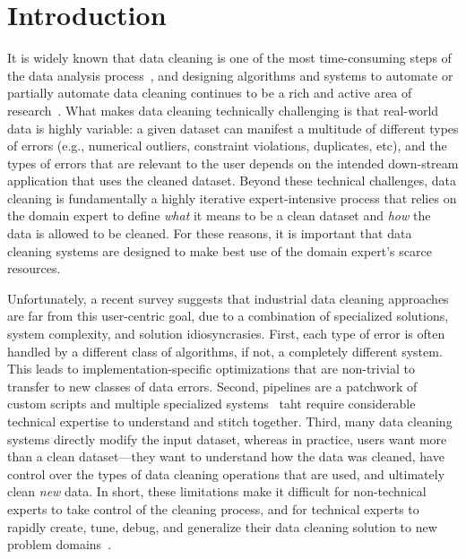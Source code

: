 \section{Introduction}\label{intro}\sloppy
It is widely known that data cleaning is one of the most time-consuming steps of the data analysis process~\cite{nytimes}, and
designing algorithms and systems to automate or partially automate data cleaning continues to be a rich and active area of research~\cite{DBLP:conf/sigmod/ChuIKW16}.
What makes data cleaning technically challenging is that real-world data is highly variable: a given dataset can manifest a multitude of different types of errors (e.g., numerical outliers, constraint violations, duplicates, etc), and the types of errors that are relevant to the user depends on the intended down-stream application that uses the cleaned dataset.
Beyond these technical challenges, data cleaning is fundamentally a highly iterative expert-intensive process that relies on the domain expert to define {\it what} it means to be a clean dataset and {\it how} the data is allowed to be cleaned.
For these reasons, it is important that data cleaning systems are designed to make best use of the domain expert's scarce resources.


Unfortunately, a recent survey suggests that industrial data cleaning approaches are far from this user-centric goal, due to a combination of specialized solutions, system complexity, and solution idiosyncrasies.  First, each type of error is often handled by a different class of algorithms, if not, a completely different system.  This leads to implementation-specific optimizations that are non-trivial to transfer to new classes of data errors.   Second, pipelines are a patchwork of custom scripts and multiple specialized systems~\cite{krishnan2016hilda} taht require considerable technical expertise to understand and stitch together.  Third, many data cleaning systems directly modify the input dataset, whereas in practice, users want more than a clean dataset---they want to understand how the data was cleaned, have control over the types of data cleaning operations that are used, and ultimately clean {\it new} data.  In short, these limitations make it difficult for non-technical experts to take control of the cleaning process, and for technical experts to rapidly create, tune, debug, and generalize their data cleaning solution to new problem domains~\cite{sculley2014machine,krishnan2016hilda}.

